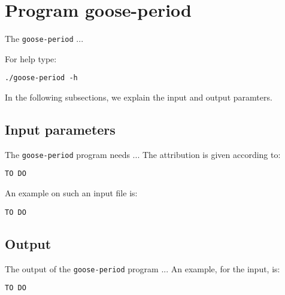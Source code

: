 \section{Program goose-period}
The \texttt{goose-period} ...

For help type:
\begin{lstlisting}
./goose-period -h
\end{lstlisting}
In the following subsections, we explain the input and output paramters.

\subsection{Input parameters}

The \texttt{goose-period} program needs ...
The attribution is given according to:
\begin{lstlisting}
TO DO
\end{lstlisting}

An example on such an input file is:
\begin{lstlisting}
TO DO
\end{lstlisting}

\subsection{Output}
The output of the \texttt{goose-period} program ...
An example, for the input, is:
\begin{lstlisting}
TO DO
\end{lstlisting}
